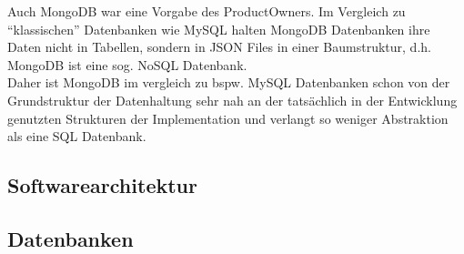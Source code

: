 Auch MongoDB war eine Vorgabe des ProductOwners.
Im Vergleich zu “klassischen” Datenbanken wie MySQL halten MongoDB Datenbanken ihre Daten nicht in Tabellen, sondern in JSON Files in einer Baumstruktur, d.h. MongoDB ist eine sog. NoSQL Datenbank. \\
Daher ist MongoDB im vergleich zu bspw. MySQL Datenbanken schon von der Grundstruktur der Datenhaltung sehr nah an der tatsächlich in der Entwicklung genutzten Strukturen der Implementation und verlangt so weniger Abstraktion als eine SQL Datenbank.

\subsection{Softwarearchitektur}

\subsection{Datenbanken}